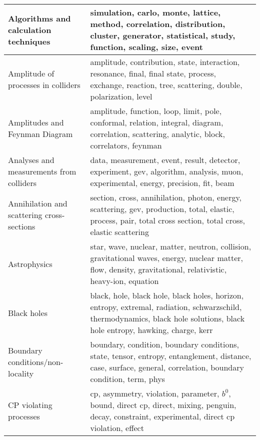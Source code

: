 \begin{longtable}[H]{p{}|p{}}
\bottomrule
\endlastfoot
Algorithms and calculation techniques                 &                                                               simulation, carlo, monte, lattice, method, correlation, distribution, cluster, generator, statistical, study, function, scaling, size, event \\ \midrule
Amplitude of processes in colliders                   &                                                     amplitude, contribution, state, interaction, resonance, final, final state, process, exchange, reaction, tree, scattering, double, polarization, level \\ \midrule
Amplitudes and Feynman Diagram                        &                                                             amplitude, function, loop, limit, pole, conformal, relation, integral, diagram, correlation, scattering, analytic, block, correlators, feynman \\ \midrule
Analyses and measurements from colliders              &                                                                         data, measurement, event, result, detector, experiment, gev, algorithm, analysis, muon, experimental, energy, precision, fit, beam \\ \midrule
Annihilation and scattering cross-sections            &                                             section, cross, annihilation, photon, energy, scattering, gev, production, total, elastic, process, pair, total cross section, total cross, elastic scattering \\ \midrule
Astrophysics                                          &                                              star, wave, nuclear, matter, neutron, collision, gravitational waves, energy, nuclear matter, flow, density, gravitational, relativistic, heavy-ion, equation \\ \midrule
Black holes                                           &                                black, hole, black hole, black holes, horizon, entropy, extremal, radiation, schwarzschild, thermodynamics, black hole solutions, black hole entropy, hawking, charge, kerr \\ \midrule
Boundary conditions/non-locality                      &                                              boundary, condition, boundary conditions, state, tensor, entropy, entanglement, distance, case, surface, general, correlation, boundary condition, term, phys \\ \midrule
CP violating processes                                &                                                        cp, asymmetry, violation, parameter, $b^0$, bound, direct cp, direct, mixing, penguin, decay, constraint, experimental, direct cp violation, effect \\ \midrule

\end{longtable}

